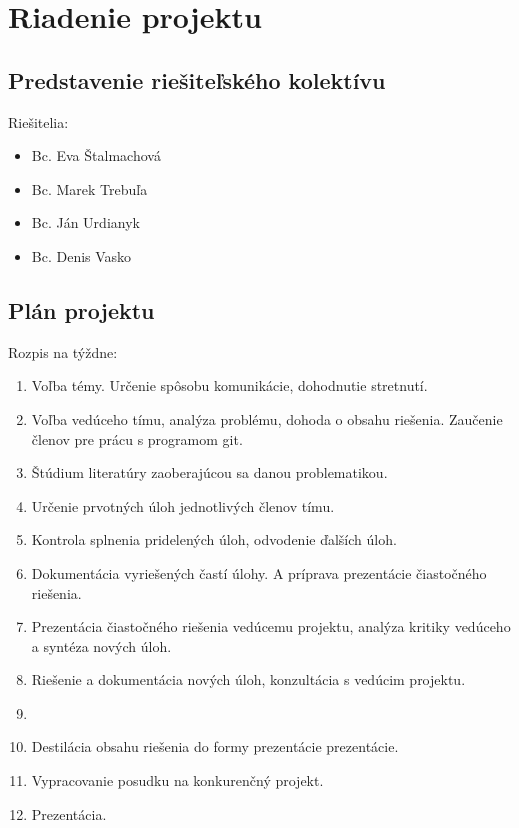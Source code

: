 


	\section{Riadenie projektu}
	\newpage
    \subsection{Predstavenie riešiteľského kolektívu}
    Riešitelia:
    \begin{itemize}
    	\item Bc. Eva Štalmachová  
    	\item Bc. Marek Trebuľa  
    	\item Bc. Ján Urdianyk  
    	\item Bc. Denis Vasko 
    \end{itemize}
    
   
    
    \subsection{Plán projektu}
    Rozpis na týždne:
    \begin{enumerate}
    	\item Voľba témy. Určenie spôsobu komunikácie, dohodnutie stretnutí. 
    	\item Voľba vedúceho tímu, analýza problému, dohoda o obsahu riešenia. Zaučenie členov pre prácu s programom git. 
    	\item Štúdium literatúry zaoberajúcou sa danou problematikou.
    	\item Určenie prvotných úloh jednotlivých členov tímu.
    	\item Kontrola splnenia pridelených úloh, odvodenie ďalších úloh.
    	\item Dokumentácia vyriešených častí úlohy. A príprava prezentácie čiastočného riešenia.
    	\item Prezentácia čiastočného riešenia vedúcemu projektu, analýza kritiky vedúceho a syntéza nových úloh. 
    	\item Riešenie a dokumentácia nových úloh, konzultácia s vedúcim projektu.
    	\item 
    	\item Destilácia obsahu riešenia do formy prezentácie prezentácie.
    	\item Vypracovanie posudku na konkurenčný projekt.
    	\item Prezentácia.
    \end{enumerate}

